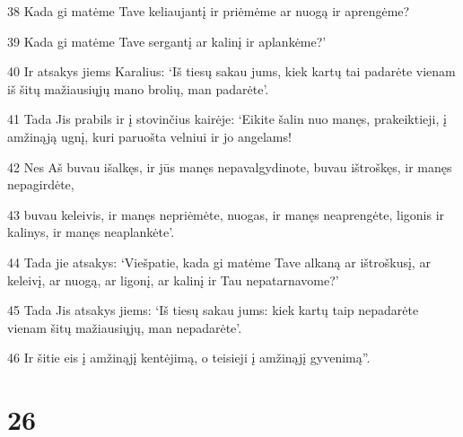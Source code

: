 \par 38 Kada gi matėme Tave keliaujantį ir priėmėme ar nuogą ir aprengėme? 
\par 39 Kada gi matėme Tave sergantį ar kalinį ir aplankėme?’ 
\par 40 Ir atsakys jiems Karalius: ‘Iš tiesų sakau jums, kiek kartų tai padarėte vienam iš šitų mažiausiųjų mano brolių, man padarėte’. 
\par 41 Tada Jis prabils ir į stovinčius kairėje: ‘Eikite šalin nuo manęs, prakeiktieji, į amžinąją ugnį, kuri paruošta velniui ir jo angelams! 
\par 42 Nes Aš buvau išalkęs, ir jūs manęs nepavalgydinote, buvau ištroškęs, ir manęs nepagirdėte, 
\par 43 buvau keleivis, ir manęs nepriėmėte, nuogas, ir manęs neaprengėte, ligonis ir kalinys, ir manęs neaplankėte’. 
\par 44 Tada jie atsakys: ‘Viešpatie, kada gi matėme Tave alkaną ar ištroškusį, ar keleivį, ar nuogą, ar ligonį, ar kalinį ir Tau nepatarnavome?’ 
\par 45 Tada Jis atsakys jiems: ‘Iš tiesų sakau jums: kiek kartų taip nepadarėte vienam šitų mažiausiųjų, man nepadarėte’. 
\par 46 Ir šitie eis į amžinąjį kentėjimą, o teisieji į amžinąjį gyvenimą”.



\chapter{26}


